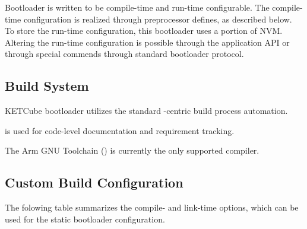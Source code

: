 Bootloader is written to be compile-time and run-time configurable. 
The compile-time configuration is realized through preprocessor defines, as described below.
To store the run-time configuration, this bootloader uses a portion of NVM.
Altering the run-time configuration is possible through the application API 
or through special commends through standard bootloader protocol.

\subsection{Build System}

KETCube bootloader utilizes the standard -centric build process automation. 

 is used for code-level documentation and requirement tracking.

The Arm GNU Toolchain () is currently the only supported compiler.


\subsection{Custom Build Configuration}

  The folowing table summarizes the compile- and link-time options, which can be used for the static bootloader configuration.


